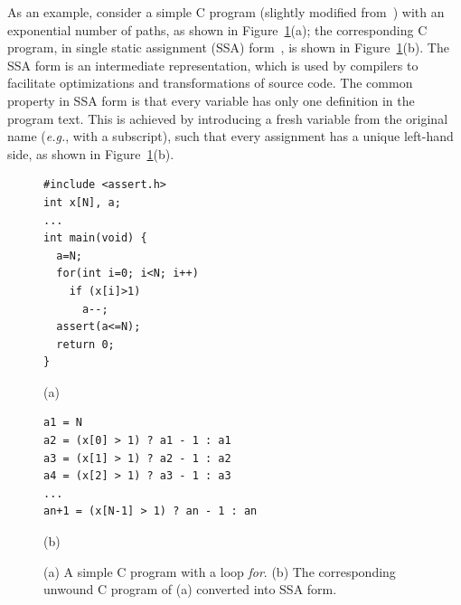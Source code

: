 \documentclass[format=acmsmall, review=false, screen=true]{acmart}
\begin{document}
As an example, consider a simple C program (slightly modified from~\cite{Strichman08}) with an exponential number of paths, as shown in Figure~\ref{figure:verification-condition}(a); the corresponding C program, in single static assignment (SSA) form~\cite{Appel97}, is shown in Figure~\ref{figure:verification-condition}(b). The SSA form is an intermediate representation, which is used by compilers to facilitate optimizations and transformations of source code. The common property in SSA form is that every variable has only one definition in the program text. This is achieved by introducing a fresh variable from the original name ({\it e.g.}, with a subscript), such that every assignment has a unique left-hand side, as shown in Figure~\ref{figure:verification-condition}(b).
%
\begin{figure}[ht]
\centering
\begin{minipage}{0.45\textwidth}
\begin{lstlisting}
#include <assert.h>
int x[N], a;
...
int main(void) {
  a=N;
  for(int i=0; i<N; i++)
    if (x[i]>1)
      a--;
  assert(a<=N);
  return 0;
}
\end{lstlisting}
\end{minipage}
\begin{center}
(a)
\end{center}
\centering
\begin{minipage}{0.45\textwidth}
\begin{lstlisting}
a1 = N
a2 = (x[0] > 1) ? a1 - 1 : a1
a3 = (x[1] > 1) ? a2 - 1 : a2
a4 = (x[2] > 1) ? a3 - 1 : a3
...
an+1 = (x[N-1] > 1) ? an - 1 : an 
\end{lstlisting}
\end{minipage}
\begin{center}
(b)
\end{center}
\caption{(a) A simple C program with a loop \textit{for}. (b) The corresponding unwound C program of (a) converted into SSA form.} 
\label{figure:verification-condition}
\end{figure}
\end{document}
